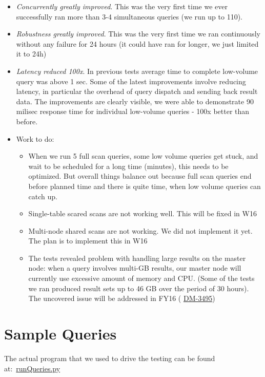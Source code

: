 \documentclass[DM,toc]{lsstdoc}
\begin{document}
\begin{itemize}
\item
  \emph{Concurrently greatly improved}. This was the very first time we
  ever successfully ran more than 3-4 simultaneous queries (we run up to
  110).
\item
  \emph{Robustness greatly improved}. This was the very first time we
  ran continuously without any failure for 24 hours (it could have ran
  for longer, we just limited it to 24h)
\item
  \emph{Latency reduced 100x}. In previous tests average time to
  complete low-volume query was above 1 sec. Some of the latest
  improvements involve reducing latency, in particular the overhead of
  query dispatch and sending back result data. The improvements are
  clearly visible, we were able to demonstrate 90 milisec response time
  for individual low-volume queries - 100x better than before.
\item
  Work to do:

  \begin{itemize}
  \item
    When we run 5 full scan queries, some low volume queries get stuck,
    and wait to be scheduled for a long time (minutes), this needs to be
    optimized. But overall things balance out because full scan queries
    end before planned time and there is quite time, when low volume
    queries can catch up.
  \item
    Single-table scared scans are not working well. This will be fixed
    in W16
  \item
    Multi-node shared scans are not working. We did not implement it
    yet. The plan is to implement this in W16
  \item
    The tests revealed problem with handling large results on the master
    node: when a query involves multi-GB results, our master node will
    currently use excessive amount of memory and CPU. (Some of the tests
    we ran produced result sets up to 46 GB over the period of 30
    hours). The uncovered issue will be addressed in FY16 (%
    \href{https://jira.lsstcorp.org/browse/DM-3495}{DM-3495})~
  \end{itemize}
\end{itemize}

\section{Sample Queries}\label{sample-queries}

The actual program that we used to drive the testing can be found
at:~\href{https://github.com/lsst-dm/db_tests_summer15/blob/tickets/DM-3364/DM-3364/runQueries.py}{runQueries.py}
\end{document}
